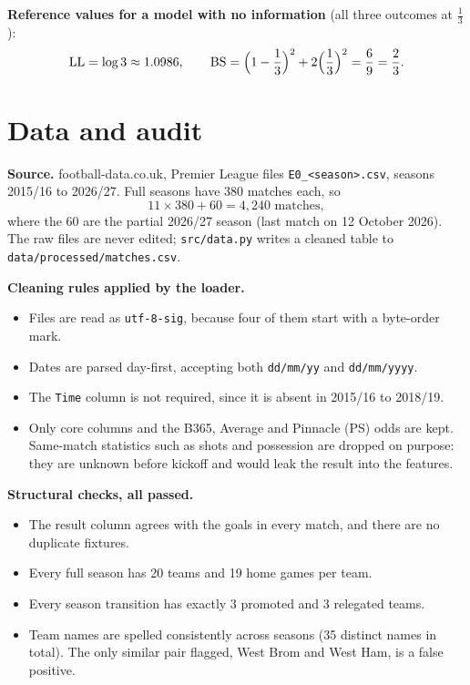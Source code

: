 \documentclass[12pt,a4paper]{article}
\begin{document}
\begin{keybox}
\textbf{Reference values for a model with no information} (all three outcomes at $\tfrac13$):
\[
\mathrm{LL}=\log 3\approx 1.0986,\qquad
\mathrm{BS}=\Bigl(1-\frac13\Bigr)^{2}+2\Bigl(\frac13\Bigr)^{2}=\frac{6}{9}=\frac23 .
\]
\end{keybox}

\section{Data and audit}

\textbf{Source.} football-data.co.uk, Premier League files \texttt{E0\_<season>.csv}, seasons
2015/16 to 2026/27. Full seasons have 380 matches each, so
\[
11\times 380 + 60 = 4{,}240 \text{ matches},
\]
where the 60 are the partial 2026/27 season (last match on 12 October 2026). The raw files are never
edited; \texttt{src/data.py} writes a cleaned table to
\texttt{data/\allowbreak processed/\allowbreak matches.csv}.

\textbf{Cleaning rules applied by the loader.}
\begin{itemize}
\item Files are read as \texttt{utf-8-sig}, because four of them start with a byte-order mark.
\item Dates are parsed day-first, accepting both \texttt{dd/mm/yy} and \texttt{dd/mm/yyyy}.
\item The \texttt{Time} column is not required, since it is absent in 2015/16 to 2018/19.
\item Only core columns and the B365, Average and Pinnacle (PS) odds are kept. Same-match
statistics such as shots and possession are dropped on purpose: they are unknown before kickoff and
would leak the result into the features.
\end{itemize}

\textbf{Structural checks, all passed.}
\begin{itemize}
\item The result column agrees with the goals in every match, and there are no duplicate fixtures.
\item Every full season has 20 teams and 19 home games per team.
\item Every season transition has exactly 3 promoted and 3 relegated teams.
\item Team names are spelled consistently across seasons (35 distinct names in total). The only
similar pair flagged, West Brom and West Ham, is a false positive.
\end{itemize}
\end{document}
